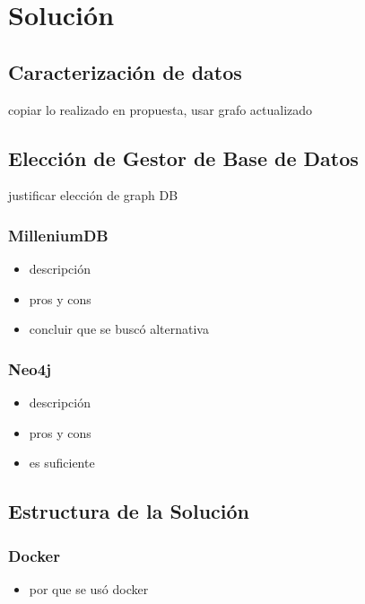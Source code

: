 \chapter{Solución}
\section{Caracterización de datos}\label{sec:obj-g}

copiar lo realizado en propuesta, usar grafo actualizado

\section{Elección de Gestor de Base de Datos}\label{sec:obj-e}

justificar elección de graph DB

\subsection{MilleniumDB}

\begin{itemize}
    \item descripción
    \item pros y cons
    \item concluir que se buscó alternativa
\end{itemize}

\subsection{Neo4j}

\begin{itemize}
    \item descripción
    \item pros y cons
    \item es suficiente
\end{itemize}

\section{Estructura de la Solución}

\subsection{Docker}
\begin{itemize}
    \item por que se usó docker
\end{itemize}

